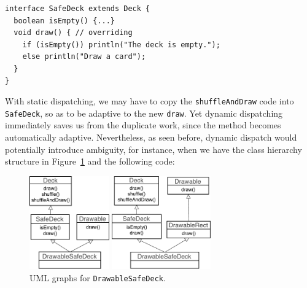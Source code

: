 \vspace{3pt}\begin{lstlisting}
interface SafeDeck extends Deck {
  boolean isEmpty() {...}
  void draw() { // overriding
    if (isEmpty()) println("The deck is empty.");
    else println("Draw a card");
  }
}
\end{lstlisting}\vspace{3pt}
With static dispatching, we may have to copy the \lstinline|shuffleAndDraw| code into \lstinline|SafeDeck|,
so as to be adaptive to the new \lstinline|draw|. Yet dynamic dispatching immediately saves us from the duplicate work,
since the method becomes automatically adaptive. Nevertheless, as seen before, dynamic dispatch would potentially introduce ambiguity,
for instance, when we have the class hierarchy structure in Figure~\ref{fig:drawablesafedeck} and the following code:


\begin{figure}[t]
  \centering
  \begin{minipage}[t]{0.4\textwidth}
  \includegraphics[height=4cm]{pics/DrawableSafeDeck1.pdf}
  \end{minipage}
  \hspace*{2pt}
  \begin{minipage}[t]{0.5\textwidth}
  \includegraphics[height=4cm]{pics/DrawableSafeDeck0.pdf}
  \end{minipage}
  \caption{UML graphs for \lstinline|DrawableSafeDeck|.}\label{fig:drawablesafedeck}
\end{figure}


